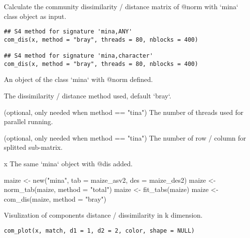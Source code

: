 \documentclass[a4paper]{book}
\begin{document}
%
\begin{Description}\relax
Calculate the community dissimilarity / distance matrix of @norm with `mina`
class object as input.
\end{Description}
%
\begin{Usage}
\begin{verbatim}
## S4 method for signature 'mina,ANY'
com_dis(x, method = "bray", threads = 80, nblocks = 400)

## S4 method for signature 'mina,character'
com_dis(x, method = "bray", threads = 80, nblocks = 400)
\end{verbatim}
\end{Usage}
%
\begin{Arguments}
\begin{ldescription}
\item[\code{x}] An object of the class `mina` with @norm defined.

\item[\code{method}] The dissimilarity / distance method used, default `bray`.

\item[\code{threads}] (optional, only needed when method == "tina") The number of
threads used for parallel running.

\item[\code{nblocks}] (optional, only needed when method == "tina") The number of
row / column for splitted sub-matrix.
\end{ldescription}
\end{Arguments}
%
\begin{Value}
x The same `mina` object with @dis added.
\end{Value}
%
\begin{Examples}
\begin{ExampleCode}
maize <- new("mina", tab = maize_asv2, des = maize_des2)
maize <- norm_tab(maize, method = "total")
maize <- fit_tabs(maize)
maize <- com_dis(maize, method = "bray")
\end{ExampleCode}
\end{Examples}
%
\begin{Description}\relax
Visulization of components distance / dissimilarity in k dimension.
\end{Description}
%
\begin{Usage}
\begin{verbatim}
com_plot(x, match, d1 = 1, d2 = 2, color, shape = NULL)
\end{verbatim}
\end{Usage}
\end{document}

